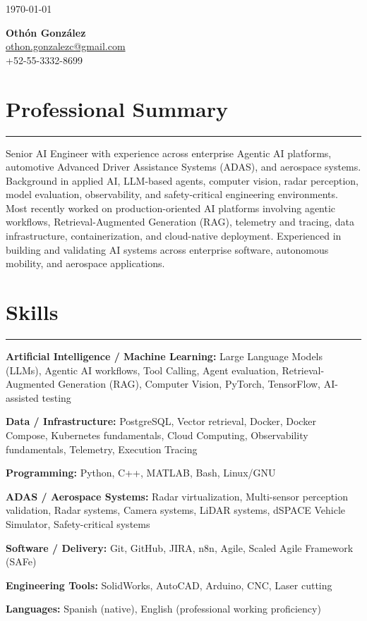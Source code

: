 \documentclass[11pt]{article}
\begin{document}
\begin{flushright}
\today
\end{flushright}

\begin{center}
{\Large \textbf{Oth\'on Gonz\'alez}}\\[4pt]
\href{mailto:othon.gonzalezc@gmail.com}{othon.gonzalezc@gmail.com} \\
+52-55-3332-8699 \\
\end{center}

\section*{Professional Summary}
\vspace{-10pt}
\noindent\rule{\textwidth}{0.4pt}
Senior AI Engineer with experience across enterprise Agentic AI platforms, automotive Advanced Driver Assistance Systems (ADAS), and aerospace systems. Background in applied AI, LLM-based agents, computer vision, radar perception, model evaluation, observability, and safety-critical engineering environments. Most recently worked on production-oriented AI platforms involving agentic workflows, Retrieval-Augmented Generation (RAG), telemetry and tracing, data infrastructure, containerization, and cloud-native deployment. Experienced in building and validating AI systems across enterprise software, autonomous mobility, and aerospace applications.

\section{Skills}
\vspace{-10pt}
\noindent\rule{\textwidth}{0.4pt}
{\raggedright\setlength{\parindent}{0pt}
\textbf{Artificial Intelligence / Machine Learning:} Large Language Models (LLMs), Agentic AI workflows, Tool Calling, Agent evaluation, Retrieval-Augmented Generation (RAG), Computer Vision, PyTorch, TensorFlow, AI-assisted testing

\textbf{Data / Infrastructure:} PostgreSQL, Vector retrieval, Docker, Docker Compose, Kubernetes fundamentals, Cloud Computing, Observability fundamentals, Telemetry, Execution Tracing

\textbf{Programming:} Python, C++, MATLAB, Bash, Linux/GNU

\textbf{ADAS / Aerospace Systems:} Radar virtualization, Multi-sensor perception validation, Radar systems, Camera systems, LiDAR systems, dSPACE Vehicle Simulator, Safety-critical systems

\textbf{Software / Delivery:} Git, GitHub, JIRA, n8n, Agile, Scaled Agile Framework (SAFe)

\textbf{Engineering Tools:} SolidWorks, AutoCAD, Arduino, CNC, Laser cutting

\textbf{Languages:} Spanish (native), English (professional working proficiency)
\par}
\end{document}
